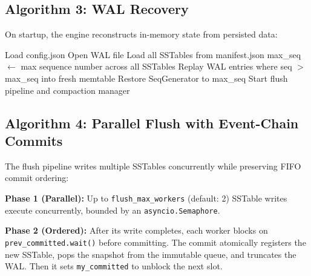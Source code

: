 \documentclass[oneside,a4paper,12pt]{book}
\begin{document}
\subsection{Algorithm 3: WAL Recovery}

On startup, the engine reconstructs in-memory state from persisted data:

\begin{algorithm}[H]
\caption{WAL Recovery}
\begin{algorithmic}[1]
\STATE Load config.json
\STATE Open WAL file
\STATE Load all SSTables from manifest.json
\STATE max\_seq $\leftarrow$ max sequence number across all SSTables
\STATE Replay WAL entries where seq $>$ max\_seq into fresh memtable
\STATE Restore SeqGenerator to max\_seq
\STATE Start flush pipeline and compaction manager
\end{algorithmic}
\end{algorithm}

\subsection{Algorithm 4: Parallel Flush with Event-Chain Commits}

The flush pipeline writes multiple SSTables concurrently while preserving FIFO commit ordering:

\textbf{Phase 1 (Parallel):} Up to \texttt{flush\_max\_workers} (default: 2) SSTable writes execute concurrently, bounded by an \texttt{asyncio.Semaphore}.

\textbf{Phase 2 (Ordered):} After its write completes, each worker blocks on \\ \texttt{prev\_committed.wait()} before committing. The commit atomically registers the new SSTable, pops the snapshot from the immutable queue, and truncates the WAL. Then it sets \texttt{my\_committed} to unblock the next slot.

\end{document}
